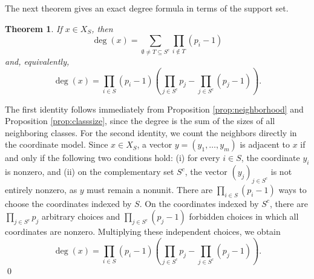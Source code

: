 \documentclass[12pt]{article}
\renewenvironment{proof}{{\bf \noindent Proof.}}{\qed}
\newtheorem{theorem}{Theorem}[section]
\theoremstyle{definition}
\begin{document}
	\medskip
	 The next theorem gives an exact degree formula in terms of the support set.	
	\begin{theorem}\label{thm:degreeformula}
		If $x\in X_S$,  then
		$$
		\deg(x)=\sum_{\emptyset\neq T\subseteq S^c}\prod_{i\notin T}(p_i-1)
		$$
		and, equivalently,
		$$
		\deg(x)=\prod_{i\in S}(p_i-1)\left(\prod_{j\in S^c}p_j-\prod_{j\in S^c}(p_j-1)\right).
		$$
	\end{theorem}
	
	\begin{proof}
		The first identity follows immediately from Proposition \ref{prop:neighborhood} and Proposition \ref{prop:classsize}, since the degree is the sum of the sizes of all neighboring classes. For the second identity, we count the neighbors directly in the coordinate model. Since $x\in X_S$, a vector $y=(y_1,\dots,y_m)$ is adjacent to $x$ if and only if the following two conditions hold:  (i) for every $i\in S$, the coordinate $y_i$ is nonzero, and (ii)   on the complementary set $S^c$, the vector $(y_j)_{j\in S^c}$ is not entirely nonzero, as $y$ must remain a nonunit. There are $\prod_{i\in S}(p_i-1)$ ways to choose the coordinates indexed by $S$. On the coordinates indexed by $S^c$, there are $\prod_{j\in S^c}p_j$ arbitrary choices and $\prod_{j\in S^c}(p_j-1)$ forbidden choices in which all coordinates are nonzero. Multiplying these independent choices, we obtain
		$$
		\deg(x)=\prod_{i\in S}(p_i-1)\left(\prod_{j\in S^c}p_j-\prod_{j\in S^c}(p_j-1)\right).
		$$
	\end{proof}
	
\end{document}
